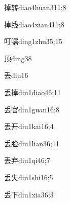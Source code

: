 \begin{verbete}{掉转}{diao4huan3}{11;8}
\end{verbete}

\begin{verbete}{掉线}{diao4xian4}{11;8}
\end{verbete}

\begin{verbete}{叮嘱}{ding1zhu3}{5;15}
\end{verbete}

\begin{verbete}{顶}{ding3}{8}
\end{verbete}

\begin{verbete}{丢}{diu1}{6}
\end{verbete}

\begin{verbete}{丢掉}{diu1diao4}{6;11}
\end{verbete}

\begin{verbete}{丢官}{diu1guan1}{6;8}
\end{verbete}

\begin{verbete}{丢开}{diu1kai1}{6;4}
\end{verbete}

\begin{verbete}{丢脸}{diu1lian3}{6;11}
\end{verbete}

\begin{verbete}{丢弃}{diu1qi4}{6;7}
\end{verbete}

\begin{verbete}{丢失}{diu1shi1}{6;5}
\end{verbete}

\begin{verbete}{丢下}{diu1xia3}{6;3}
\end{verbete}

